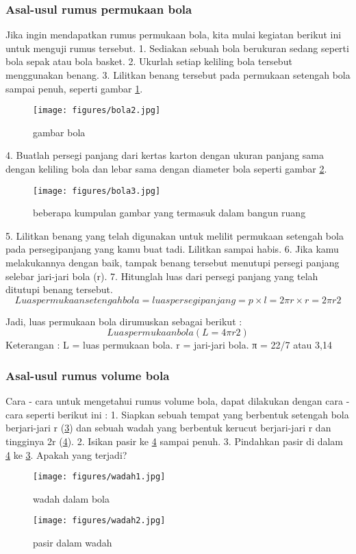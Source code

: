 \subsubsection{Asal-usul rumus permukaan bola}
Jika ingin mendapatkan rumus permukaan bola, kita mulai kegiatan berikut ini untuk menguji rumus tersebut.
1. Sediakan sebuah bola berukuran sedang seperti bola sepak atau bola basket.
2. Ukurlah setiap keliling bola tersebut menggunakan benang.
3. Lilitkan benang tersebut pada permukaan setengah bola sampai penuh, seperti gambar \ref{bola2}.
\begin{figure}[ht]
    \centerline{\texttt{[image: figures/bola2.jpg]}}
    \caption{gambar bola}
    \label{bola2}
    \end{figure}
4. Buatlah persegi panjang dari kertas karton dengan ukuran panjang sama dengan keliling bola dan lebar sama dengan diameter bola seperti gambar \ref{bola3}.
\begin{figure}[ht]
    \centerline{\texttt{[image: figures/bola3.jpg]}}
    \caption{beberapa kumpulan gambar yang termasuk dalam bangun ruang}
    \label{bola3}
    \end{figure}
5. Lilitkan benang yang telah digunakan untuk melilit permukaan setengah bola pada persegipanjang yang kamu buat tadi. Lilitkan sampai habis.
6. Jika kamu melakukannya dengan baik, tampak benang tersebut menutupi persegi panjang selebar jari-jari bola (r).
7. Hitunglah luas dari persegi panjang yang telah ditutupi benang tersebut. 
\begin{equation}
Luas permukaan setengah bola = luas persegi panjang
                                           = p × l
                                           = 2πr× r
                                           = 2π r2
\end{equation}

Jadi, luas permukaan bola dirumuskan sebagai berikut :
\begin{equation}
Luas permukaan bola ( L = 4πr2 )
\end{equation}
Keterangan :
L = luas permukaan bola.
r = jari-jari bola.
π = 22/7 atau 3,14

\subsubsection{Asal-usul rumus volume bola}
Cara - cara untuk mengetahui rumus volume bola, dapat dilakukan dengan cara - cara seperti berikut ini : 
1. Siapkan sebuah tempat yang berbentuk setengah bola berjari-jari r (\ref{wadah1}) dan sebuah wadah yang berbentuk kerucut berjari-jari r dan tingginya 2r (\ref{wadah2}).
2. Isikan pasir ke \ref{wadah2} sampai penuh.
3. Pindahkan pasir di dalam \ref{wadah2} ke \ref{wadah1}. Apakah yang terjadi?
\begin{figure}[ht]
    \centerline{\texttt{[image: figures/wadah1.jpg]}}
    \caption{wadah dalam bola}
    \label{wadah1}
    \end{figure}
\begin{figure}[ht]
    \centerline{\texttt{[image: figures/wadah2.jpg]}}
    \caption{pasir dalam wadah}
    \label{wadah2}
    \end{figure}

